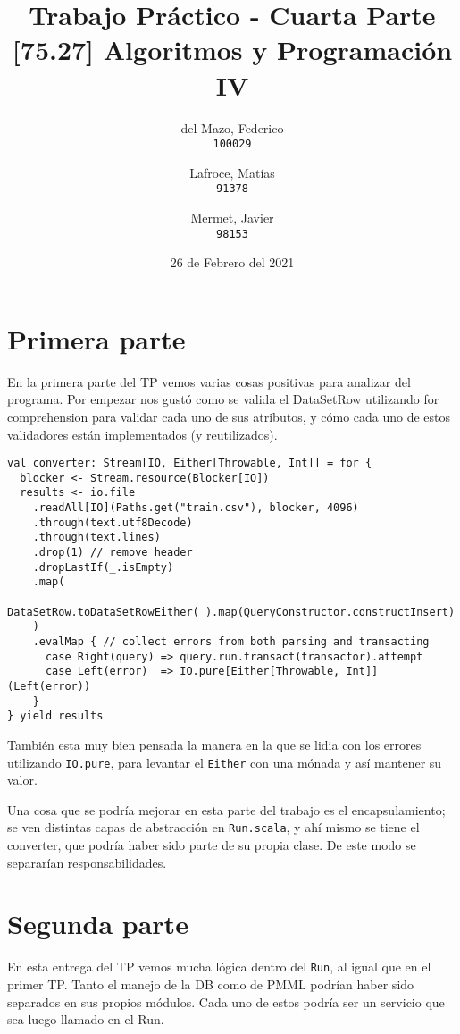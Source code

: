 \documentclass{article}
\title{Trabajo Práctico - Cuarta Parte \\ \large{[75.27] Algoritmos y Programación IV}}
\author{
	del Mazo, Federico\\
	\texttt{100029}
	\and
	Lafroce, Matías\\
	\texttt{91378}\\
	\and
	Mermet, Javier\\
	\texttt{98153}
}
\date{26 de Febrero del 2021}
\begin{document}
\maketitle


\section{Primera parte}
En la primera parte del TP vemos varias cosas positivas para analizar del programa. Por empezar nos gustó como se valida el DataSetRow utilizando for comprehension para validar cada uno de sus atributos, y cómo cada uno de estos validadores están implementados (y reutilizados).

\begin{verbatim}
val converter: Stream[IO, Either[Throwable, Int]] = for {
  blocker <- Stream.resource(Blocker[IO])
  results <- io.file
    .readAll[IO](Paths.get("train.csv"), blocker, 4096)
    .through(text.utf8Decode)
    .through(text.lines)
    .drop(1) // remove header
    .dropLastIf(_.isEmpty)
    .map(
      DataSetRow.toDataSetRowEither(_).map(QueryConstructor.constructInsert)
    )
    .evalMap { // collect errors from both parsing and transacting
      case Right(query) => query.run.transact(transactor).attempt
      case Left(error)  => IO.pure[Either[Throwable, Int]](Left(error))
    }
} yield results
\end{verbatim}

También esta muy bien pensada la manera en la que se lidia con los errores utilizando \texttt{IO.pure}, para levantar el \texttt{Either} con una mónada y así mantener su valor.

Una cosa que se podría mejorar en esta parte del trabajo es el encapsulamiento; se ven distintas capas de abstracción en \texttt{Run.scala}, y ahí mismo se tiene el converter, que podría haber sido parte de su propia clase. De este modo se separarían responsabilidades.

\section{Segunda parte}
En esta entrega del TP vemos mucha lógica dentro del \texttt{Run}, al igual que en el primer TP. Tanto el manejo de la DB como de PMML podrían haber sido separados en sus propios módulos. Cada uno de estos podría ser un servicio que sea luego llamado en el Run.
\end{document}

